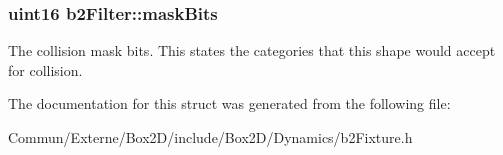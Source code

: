 \subsubsection[{\texorpdfstring{mask\+Bits}{maskBits}}]{\setlength{\rightskip}{0pt plus 5cm}uint16 b2\+Filter\+::mask\+Bits}\hypertarget{structb2_filter_a533cccf85e3ba3d9e3700d73b819f6e2}{}\label{structb2_filter_a533cccf85e3ba3d9e3700d73b819f6e2}
The collision mask bits. This states the categories that this shape would accept for collision. 

The documentation for this struct was generated from the following file\+:\begin{DoxyCompactItemize}
\item 
Commun/\+Externe/\+Box2\+D/include/\+Box2\+D/\+Dynamics/b2\+Fixture.\+h\end{DoxyCompactItemize}
